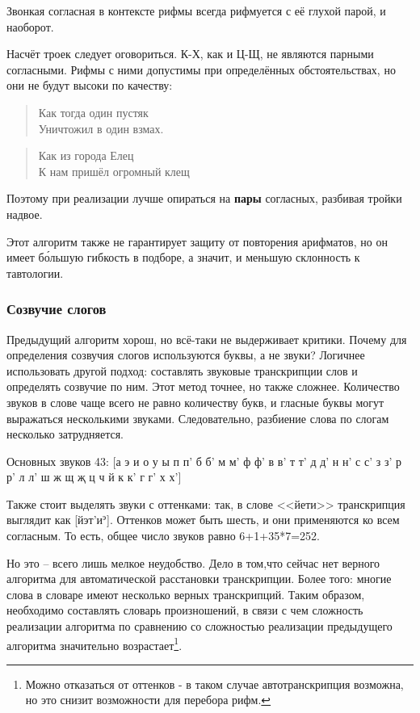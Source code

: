 Звонкая согласная в контексте рифмы всегда рифмуется с её глухой парой, и наоборот.

Насчёт троек следует оговориться. К-Х, как и Ц-Щ, не являются парными согласными. Рифмы с ними допустимы при определённых обстоятельствах, но они не будут высоки по качеству:

\begin{verse}
Как тогда один пустяк\\
Уничтожил в один взмах.
\end{verse}

\begin{verse}
Как из города Елец\\
К нам пришёл огромный клещ
\end{verse}

Поэтому при реализации лучше опираться на \textbf{пары} согласных, разбивая тройки надвое.

Этот алгоритм также не гарантирует защиту от повторения арифматов, но он имеет б\'{о}льшую гибкость в подборе, а значит, и меньшую склонность к тавтологии.

\subsubsection{Созвучие слогов}

Предыдущий алгоритм хорош, но всё-таки не выдерживает критики. Почему для определения созвучия слогов используются буквы, а не звуки? Логичнее использовать другой подход: составлять звуковые транскрипции слов и определять созвучие по ним. Этот метод точнее, но также сложнее. Количество звуков в слове чаще всего не равно количеству букв, и гласные буквы могут выражаться несколькими звуками. Следовательно, разбиение слова по слогам несколько затрудняется.

Основных звуков 43: [а э и о у ы п п' б б' м м' ф ф' в в' т т' д д' н н' с с' з з' р р' л л' ш ж щ җ ц ч й к к' г г' х х']

Также стоит выделять звуки с оттенками: так, в слове <<йети>> транскрипция выглядит как [йэт’и$^э$].  Оттенков может быть шесть, и они применяются ко всем согласным. То есть, общее число звуков равно 6+1+35*7=252.

Но это -- всего лишь мелкое неудобство. Дело в том,что сейчас нет верного алгоритма для автоматической расстановки транскрипции. Более того: многие слова в словаре имеют несколько верных транскрипций. Таким образом, необходимо составлять словарь произношений, в связи с чем сложность реализации алгоритма по сравнению со сложностью реализации предыдущего алгоритма значительно возрастает\footnote{Можно отказаться от оттенков - в таком случае автотранскрипция возможна, но это снизит возможности для перебора рифм.}.

